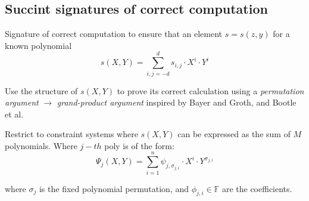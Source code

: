 \documentclass{article}
\theoremstyle{definition}
\begin{document}
\subsection{Succint signatures of correct computation}
Signature of correct computation to ensure that an element $s=s(z, y)$ for a known polynomial
$$s(X, Y) = \sum_{i, j = -d}^d s_{i, j} \cdot X^i \cdot Y^i$$

Use the structure of $s(X, Y)$ to prove its correct calculation using a \emph{permutation argument} $\longrightarrow$ \emph{grand-product argument} inspired by Bayer and Groth, and Bootle et al.

Restrict to constraint systems where $s(X, Y)$ can be expressed as the sum of $M$ polynomials. Where $j-th$ poly is of the form:
$$
\Psi_j(X, Y) =
    \sum_{i=1}^n \psi_{j, \sigma_{j, i}}
    \cdot X^i \cdot Y^{\sigma_{j, i}}
$$

where $\sigma_j$ is the fixed polynomial permutation, and $\phi_{j, i} \in \mathbb{F}$ are the coefficients.

\vspace{1cm}
\vspace{1cm}





\end{document}
